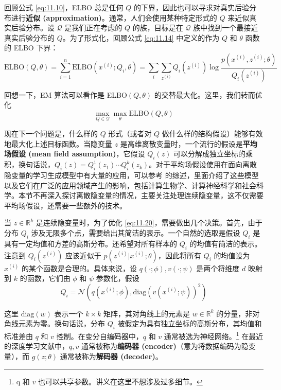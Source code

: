 回顾公式 \eqref{eq:11.10}，ELBO 总是任何 $Q$ 的下界，因此也可以寻求对真实后验分布进行\textbf{近似 (approximation)}。通常，人们会使用某种特定形式的 $Q$ 来近似真实后验分布。设 $\mathcal{Q}$ 是我们正在考虑的 $Q$ 的族，目标是在 $\mathcal{Q}$ 族中找到一个最接近真实后验分布的 $Q$。为了形式化，回顾公式 \eqref{eq:11.14} 中定义的作为 $Q$ 和 $\theta$ 函数的 ELBO 下界：
\[
    \text{ELBO}(Q, \theta) = \sum_{i=1}^n \text{ELBO}(x^{(i)}; Q_i, \theta) = \sum_i \sum_{z^{(i)}} Q_i(z^{(i)}) \log \frac{p(x^{(i)}, z^{(i)}; \theta)}{Q_i(z^{(i)})}
\]

回想一下，EM 算法可以看作是 ELBO$(Q, \theta)$ 的交替最大化。这里，我们转而优化
\begin{equation}
    \max_{Q \in \mathcal{Q}} \max_\theta \text{ELBO}(Q, \theta) \label{eq:11.20}
\end{equation}

现在下一个问题是，什么样的 $Q$ 形式（或者对 $Q$ 做什么样的结构假设）能够有效地最大化上述目标函数。当隐变量 $z$ 是高维离散变量时，一个流行的假设是\textbf{平均场假设 (mean field assumption)}，它假设 $Q_i(z)$ 可以分解成独立坐标的乘积，换句话说，$Q_i(z) = Q_i^1(z_1) \cdots Q_i^k(z_k)$。对于平均场假设使用在面向离散隐变量的学习生成模型中有大量的应用，可以参考 \cite{blei2017variational} 的综述，里面介绍了这些模型以及它们在广泛的应用领域产生的影响，包括计算生物学、计算神经科学和社会科学。本节不再深入探讨离散隐变量的情况，主要关注处理连续隐变量，这不仅需要平均场假设，还需要一些额外的技术。

当 $z \in \mathbb{R}^k$ 是连续隐变量时，为了优化 \eqref{eq:11.20}，需要做出几个决策。首先，由于分布 $Q_i$ 涉及无限多个点，需要给出其简洁的表示。一个自然的选取是假设 $Q_i$ 是具有一定均值和方差的高斯分布。还希望对所有样本的 $Q_i$ 的均值有简洁的表示。注意到 $Q_i(z^{(i)})$ 应该近似于 $p(z^{(i)}|x^{(i)}; \theta)$，因此将所有 $Q_i$ 的均值设为 $x^{(i)}$ 的某个函数是合理的。具体来说，设 $q(\cdot; \phi), v(\cdot; \psi)$ 是两个将维度 $d$ 映射到 $k$ 的函数，它们由 $\phi$ 和 $\psi$ 参数化，假设
\begin{equation}
Q_i = \mathcal{N}(q(x^{(i)}; \phi), \text{diag}(v(x^{(i)}; \psi))^2) \label{eq:11.21}
\end{equation}

这里 $\text{diag}(w)$ 表示一个 $k \times k$ 矩阵，其对角线上的元素是 $w \in \mathbb{R}^k$ 的分量，非对角线元素为零。换句话说，分布 $Q_i$ 被假定为具有独立坐标的高斯分布，其均值和标准差由 $q$ 和 $v$ 控制。在变分自编码器中，$q$ 和 $v$ 通常被选为神经网络。\footnote{q 和 $v$ 也可以共享参数。讲义在这里不想涉及过多细节。} 在最近的深度学习文献中，$q, v$ 通常被称为\textbf{编码器 (encoder)}（意为将数据编码为隐变量），而 $g(z; \theta)$ 通常被称为\textbf{解码器 (decoder)}。

